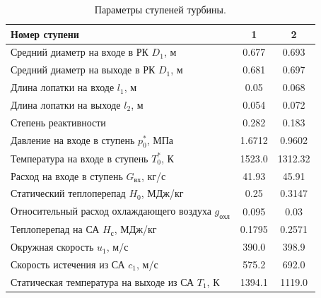 \documentclass[a4paper,12pt]{article}
\begin{document}
    
    \begin{longtable}{
    |p{8cm}|
%    
    c|
%    
    c|
%    
    }
        \caption{Параметры ступеней турбины.} \\ \hline
        Номер ступени
%        
        & 1
%        
        & 2
%        
        \\ \hline
        Средний диаметр на входе в РК $D_1$, м
%        
        & 0.677
%        
        & 0.693
%        
        \\ \hline
        Средний диаметр на выходе в РК $D_1$, м
%        
        & 0.681
%        
        & 0.697
%        
        \\ \hline
        Длина лопатки на входе  $l_1$, м
%        
        & 0.05
%        
        & 0.068
%        
        \\ \hline
        Длина лопатки на выходе  $l_2$, м
%        
        & 0.054
%        
        & 0.072
%        
        \\ \hline
        Степень реактивности
%        
        & 0.282
%        
        & 0.183
%        
        \\ \hline
        Давление на входе в ступень $p_0^*$, МПа
%        
        & 1.6712
%        
        & 0.9602
%        
        \\ \hline
        Температура на входе в ступень $T_0^*$, К
%        
        & 1523.0
%        
        & 1312.32
%        
        \\ \hline
        Расход на входе в ступень $G_{вх}$, кг/с
%        
        & 41.93
%        
        & 45.91
%        
        \\ \hline
        Статический теплоперепад $H_0$, МДж/кг
%        
        & 0.25
%        
        & 0.3147
%        
        \\ \hline
        Относительный расход охлаждающего воздуха $g_{охл}$
%        
        & 0.095
%        
        & 0.03
%        
        \\ \hline
        Теплоперепад на СА $H_с$, МДж/кг
%        
        & 0.1795
%        
        & 0.2571
%        
        \\ \hline
        Окружная скорость $u_1$, м/с
%        
        & 390.0
%        
        & 398.9
%        
        \\ \hline
        Скорость истечения из СА $c_1$, м/с
%        
        & 575.2
%        
        & 692.0
%        
        \\ \hline
        Статическая температура на выходе из СА $T_1$, К
%        
        & 1394.1
%        
        & 1119.0

\end{longtable}
\end{document}

